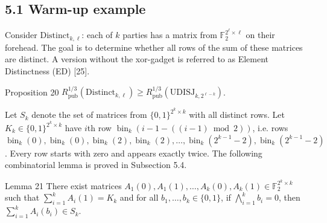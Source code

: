 \subsection*{5.1 Warm-up example}
Consider $\mathrm{Distinct}_{k,\ell}$: each of $k$ parties has a matrix from $\mathbb F_2^{2^\ell\times\ell}$ on their forehead. The goal is to determine whether all rows of the sum of these matrices are distinct. A version without the xor-gadget is referred to as Element Distinctness (ED) [25].
\begin{authorclaim}{Proposition 20}
$R^{1/3}_{\mathrm{pub}}(\mathrm{Distinct}_{k,\ell})\ge R^{1/3}_{\mathrm{pub}}(\mathrm{UDISJ}_{k,2^{\ell-k}})$.
\end{authorclaim}
Let $S_k$ denote the set of matrices from $\{0,1\}^{2^k\times k}$ with all distinct rows. Let $K_k\in\{0,1\}^{2^k\times k}$ have $i$th row $\operatorname{bin}_k(i-1-((i-1)\bmod2))$, i.e. rows $\operatorname{bin}_k(0),\operatorname{bin}_k(0),\operatorname{bin}_k(2),\operatorname{bin}_k(2),\ldots,\operatorname{bin}_k(2^{k-1}-2),\operatorname{bin}_k(2^{k-1}-2)$. Every row starts with zero and appears exactly twice.
The following combinatorial lemma is proved in Subsection 5.4.
\begin{authorclaim}{Lemma 21}
There exist matrices $A_1(0),A_1(1),\ldots,A_k(0),A_k(1)\in\mathbb F_2^{2^k\times k}$ such that $\sum_{i=1}^kA_i(1)=K_k$ and for all $b_1,\ldots,b_k\in\{0,1\}$, if $\bigwedge_{i=1}^kb_i=0$, then $\sum_{i=1}^kA_i(b_i)\in S_k$.
\end{authorclaim}
